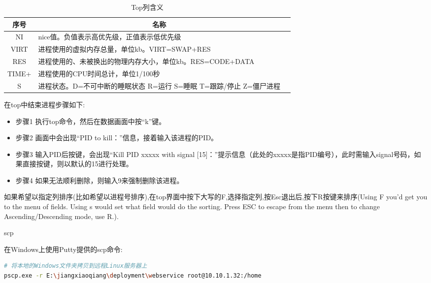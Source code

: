\documentclass[12pt]{book}
\makeatletter
\numberwithin{dummy}{section}
\theoremstyle{ocrenumbox}
\theoremstyle{blacknumex}
\theoremstyle{blacknumbox}
\theoremstyle{ocrenum}
\renewcommand\paragraph{\@startsection{paragraph}{4}{\z@}
	{-2ex \@plus-.2ex \@minus .2ex}
	{.1ex}
	{\normalfont\small\sffamily\bfseries}}
\makeatother
\begin{document}
\begin{table}
	\caption{Top列含义}
	\label{table:topcolumns}
	\begin{center}
	\begin{tabular}{cp{10cm}c}
		\hline
		\multirow{1}{*}{序号}
		& \multicolumn{1}{c}{名称}  \\
		\hline			
		NI & nice值。负值表示高优先级，正值表示低优先级 \\
		\hline	
		VIRT & 进程使用的虚拟内存总量，单位kb。VIRT=SWAP+RES \\
		\hline
		RES & 进程使用的、未被换出的物理内存大小，单位kb。RES=CODE+DATA \\
		\hline
		TIME+ & 进程使用的CPU时间总计，单位1/100秒 \\
		\hline
		S & 进程状态。D=不可中断的睡眠状态 R=运行 S=睡眠 T=跟踪/停止 Z=僵尸进程 \\
		\hline		
	\end{tabular}	
	\end{center}
\end{table}

在top中结束进程步骤如下:

\begin{itemize}
	\item{步骤1 执行top命令，然后在数据画面中按“k”键。}
	\item{步骤2 画面中会出现“PID to kill：”信息，接着输入该进程的PID。}
	\item{步骤3 输入PID后按键，会出现“Kill PID xxxxx with signal [15]：”提示信息（此处的xxxxx是指PID编号），此时需输入signal号码，如果直接按键，则以默认的15进行处理。}
	\item{步骤4 如果无法顺利删除，则输入9来强制删除该进程。}
\end{itemize}


如果希望以指定列排序(比如希望以进程号排序),在top界面中按下大写的F,选择指定列,按Esc退出后,按下R按键来排序(Using F you'd get you to the menu of fields. Using s would set what field would do the sorting. Press ESC to escape from the menu then to change Ascending/Descending mode, use R.).

\paragraph{scp}

在Windows上使用Putty提供的scp命令:

\begin{lstlisting}[language=Bash]
# 将本地的Windows文件夹拷贝到远程Linux服务器上
pscp.exe -r E:\jiangxiaoqiang\deployment\webservice root@10.10.1.32:/home
\end{lstlisting}
\end{document}
